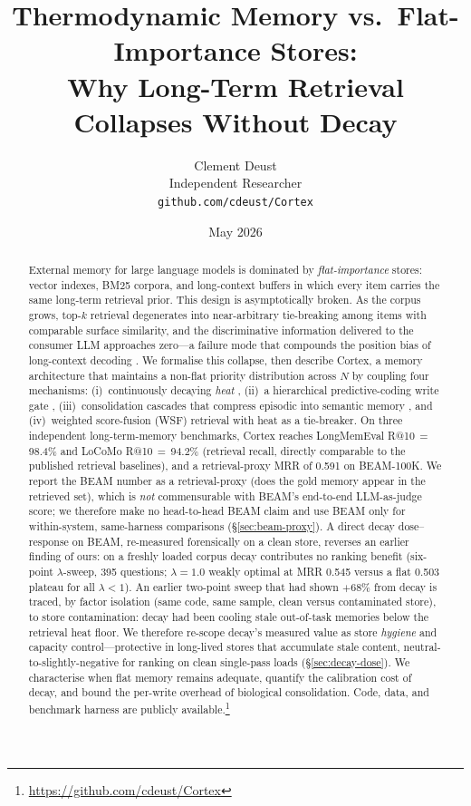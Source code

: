 \documentclass[11pt]{article}
\title{Thermodynamic Memory vs.\ Flat-Importance Stores:\\
Why Long-Term Retrieval Collapses Without Decay}
\author{
  Clement Deust\\
  Independent Researcher\\
  \texttt{github.com/cdeust/Cortex}
}
\date{May 2026}
\begin{document}
\maketitle

\begin{abstract}
External memory for large language models is dominated by
\emph{flat-importance} stores: vector indexes, BM25 corpora, and
long-context buffers in which every item carries the same long-term
retrieval prior.  This design is asymptotically broken.  As the
corpus grows, top-$k$ retrieval degenerates into near-arbitrary
tie-breaking among items with comparable surface similarity, and
the discriminative information delivered to the consumer LLM
approaches zero---a failure mode that compounds the position bias
of long-context decoding \citep{Liu2023}.  We formalise this
collapse, then describe Cortex, a memory architecture that
maintains a non-flat priority distribution across $N$ by coupling
four mechanisms: (i)~continuously decaying \emph{heat}
\citep{Ebbinghaus1885}, (ii)~a hierarchical predictive-coding
write gate \citep{Friston2010}, (iii)~consolidation cascades that
compress episodic into semantic memory
\citep{Kandel2001,McClelland1995}, and (iv)~weighted score-fusion
(WSF) retrieval with heat as a tie-breaker.  On three independent
long-term-memory
benchmarks, Cortex reaches LongMemEval R@10\,$=$\,98.4\% and
LoCoMo R@10\,$=$\,94.2\% (retrieval recall, directly comparable to
the published retrieval baselines), and a retrieval-proxy MRR of
0.591 on BEAM-100K.  We report the BEAM number as a retrieval-proxy
(does the gold memory appear in the retrieved set), which is
\emph{not} commensurable with BEAM's end-to-end LLM-as-judge score;
we therefore make no head-to-head BEAM claim and use BEAM only for
within-system, same-harness comparisons (\S\ref{sec:beam-proxy}).
A direct decay dose--response on BEAM, re-measured forensically on a
clean store, reverses an earlier finding of ours: on a freshly loaded
corpus decay contributes no ranking benefit (six-point
$\lambda$-sweep, 395 questions; $\lambda = 1.0$ weakly optimal at MRR
0.545 versus a flat 0.503 plateau for all $\lambda < 1$).  An earlier
two-point sweep that had shown $+68\%$ from decay is traced, by
factor isolation (same code, same sample, clean versus contaminated
store), to store contamination: decay had been cooling stale
out-of-task memories below the retrieval heat floor.  We therefore
re-scope decay's measured value as store \emph{hygiene} and capacity
control---protective in long-lived stores that accumulate stale
content, neutral-to-slightly-negative for ranking on clean
single-pass loads (\S\ref{sec:decay-dose}).  We characterise when
flat memory remains adequate, quantify the calibration cost of
decay, and bound the per-write overhead of biological
consolidation.  Code, data, and benchmark harness are publicly
available.\footnote{\url{https://github.com/cdeust/Cortex}}
\end{abstract}
\end{document}
